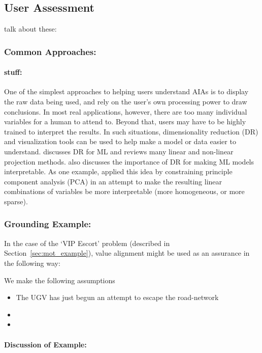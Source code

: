 \subsection{User Assessment} \label{sec:user_assessment}
talk about these: \citet{Yu2018-qw, Wickens1999-la, Riley1996-qm, Muir1996-gt, Desai2012-rc}
\subsubsection{Common Approaches:}

\paragraph{stuff:}
One of the simplest approaches to helping users understand AIAs is to display the raw data being used, and rely on the user's own processing power to draw conclusions. In most real applications, however, there are too many individual variables for a human to attend to. Beyond that, users may have to be highly trained to interpret the results. In such situations, dimensionality reduction (DR) and visualization tools can be used to help make a model or data easier to understand. \citet{Venna2007-yj} discusses DR for ML and reviews many linear and non-linear projection methods. \citet{Vellido2012-nm} also discusses the importance of DR for making ML models interpretable. As one example, \citet{Chipman2005-om} applied this idea by constraining principle component analysis (PCA) in an attempt to make the resulting linear combinations of variables be more interpretable (more homogeneous, or more sparse).


\subsubsection{Grounding Example:}
In the case of the `VIP Escort' problem (described in Section~\ref{sec:mot_example}), value alignment might be used as an assurance in the following way:

We make the following assumptions

\begin{itemize}
    \item The UGV has just begun an attempt to escape the road-network
    \item 
    \item 
\end{itemize}

\paragraph{\textbf{Discussion of Example:}} 
